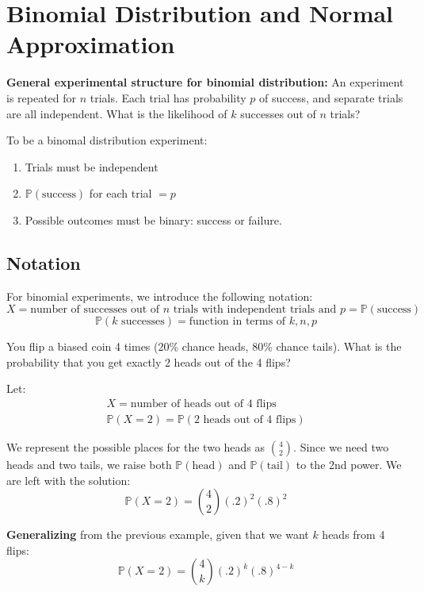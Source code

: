 \documentclass[titlepage, 12pt, leqno]{article}
\begin{document}
\pagebreak

\section{Binomial Distribution and Normal Approximation}
\textbf{General experimental structure for binomial distribution:} An experiment is repeated for $n$ trials. Each trial has probability $p$ of success, and separate trials are all independent. What is the likelihood of $k$ successes out of $n$ trials?

To be a binomal distribution experiment:
\begin{enumerate}
    \item Trials must be independent
    \item  $\mathbb{P}(\text{success})$ for each trial $= p$ 
    \item Possible outcomes must be binary: success or failure.
\end{enumerate}

\subsection{Notation}
For binomial experiments, we introduce the following notation:
\[
    X = \text{number of successes out of }n \text{ trials with independent trials and }p = \mathbb{P}(\text{success})
\]
\[
    \mathbb{P}(k \text{ successes}) = \text{function in terms of }k,n,p
\]
\begin{ex}
    You flip a biased coin 4 times (20\% chance heads, 80\% chance tails). What is the probability that you get exactly 2 heads out of the 4 flips?

    Let:
   \begin{align*}
       X = \text{number of heads out of 4 flips} \\
       \mathbb{P}(X=2) = \mathbb{P}(2 \text{ heads out of 4 flips})
   \end{align*}
   
   We represent the possible places for the two heads as $\binom{4}{2}$. Since we need two heads and two tails, we raise both $\mathbb{P}(\text{head})$ and $\mathbb{P}(\text{tail})$ to the 2nd power. We are left with the solution:
   \[
   \boxed{\mathbb{P}(X=2) = \binom{4}{2}(.2)^2(.8)^2}
   \]
\end{ex}

\textbf{Generalizing} from the previous example, given that we want $k$ heads from 4 flips:
\[
    \boxed{\mathbb{P}(X=2) = \binom{4}{k}(.2)^k(.8)^{4-k}}
\]
\end{document}
